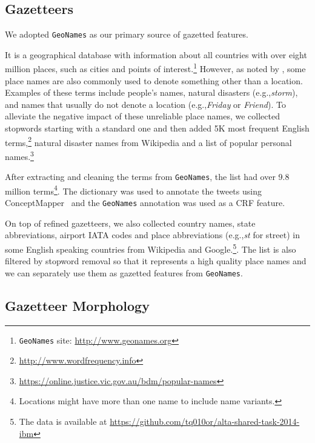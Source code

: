 \documentclass[11pt]{article}
\newcommand{\eg}{e.g.,\xspace}
\newcommand{\geoname}{\texttt{GeoNames}\xspace}
\newcommand{\myex}[1]{\textit{#1}}
\newcommand{\myurl}[1]{{\footnotesize\url{#1}}}
\begin{document}
\subsection{Gazetteers}
\label{sec:gaze_feature}

We adopted \geoname as our primary source of gazetted features.

It is a geographical database with information about all countries with over eight million places, such as cities and points of interest.\footnote{\geoname site: \myurl{http://www.geonames.org}} 
However, as noted by , some place names are also commonly used to denote something other than a location.
Examples of these terms include people's names, natural disasters (\eg \myex{storm}), and names that usually do not denote a location (\eg \myex{Friday} or \myex{Friend}).
To alleviate the negative impact of these unreliable place names, we collected stopwords starting with a standard one and then added 5K most frequent English terms,\footnote{\myurl{http://www.wordfrequency.info}} natural disaster names from Wikipedia and a list of popular personal names.\footnote{\myurl{https://online.justice.vic.gov.au/bdm/popular-names}}

After extracting and cleaning the terms from \geoname, the list had over 9.8 million terms\footnote{Locations might have more than one name to include name variants.}.
The dictionary was used to annotate the tweets using ConceptMapper~\cite{tanenblatt2010conceptmapper} and the \geoname annotation was used as a CRF feature.

On top of refined gazetteers, we also collected country names, state abbreviations, airport IATA codes and place abbreviations (\eg \myex{st} for street) in some English speaking countries from Wikipedia and Google.\footnote{The data is available at \myurl{https://github.com/tq010or/alta-shared-task-2014-ibm}}.
The list is also filtered by stopword removal so that it represents a high quality place names and we can separately use them as gazetted features from \geoname.

\subsection{Gazetteer Morphology}
\label{sec:mor_feature}
\end{document}
